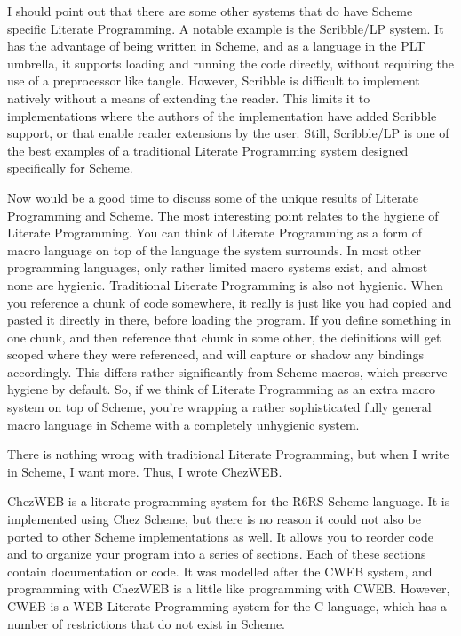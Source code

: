 I should point out that there are some other systems that do have
Scheme specific Literate Programming.  A notable example is the
Scribble/LP system.  It has the advantage of being written in Scheme,
and as a language in the PLT umbrella, it supports loading and running
the code directly, without requiring the use of a preprocessor like
tangle.  However, Scribble is difficult to implement natively without
a means of extending the reader.  This limits it to implementations
where the authors of the implementation have added Scribble support,
or that enable reader extensions by the user.  Still, Scribble/LP is
one of the best examples of a traditional Literate Programming system
designed specifically for Scheme.

Now would be a good time to discuss some of the unique results of
Literate Programming and Scheme.  The most interesting point relates
to the hygiene of Literate Programming.  You can think of Literate
Programming as a form of macro language on top of the language the
system surrounds.  In most other programming languages, only rather
limited macro systems exist, and almost none are hygienic.
Traditional Literate Programming is also not hygienic.  When you
reference a chunk of code somewhere, it really is just like you had
copied and pasted it directly in there, before loading the program.
If you define something in one chunk, and then reference that chunk in
some other, the definitions will get scoped where they were
referenced, and will capture or shadow any bindings accordingly.  This
differs rather significantly from Scheme macros, which preserve
hygiene by default.  So, if we think of Literate Programming as an
extra macro system on top of Scheme, you're wrapping a rather
sophisticated fully general macro language in Scheme with a completely
unhygienic system.

There is nothing wrong with traditional Literate Programming, but when
I write in Scheme, I want more.  Thus, I wrote ChezWEB.

%
ChezWEB is a literate programming system for the R6RS Scheme language.
It is implemented using Chez Scheme, but there is no reason it could
not also be ported to other Scheme implementations as well.  It allows
you to reorder code and to organize your program into a series of
sections.  Each of these sections contain documentation or code.  It
was modelled after the CWEB system, and programming with ChezWEB is a
little like programming with CWEB.  However, CWEB is a WEB Literate
Programming system for the C language, which has a number of
restrictions that do not exist in Scheme.

